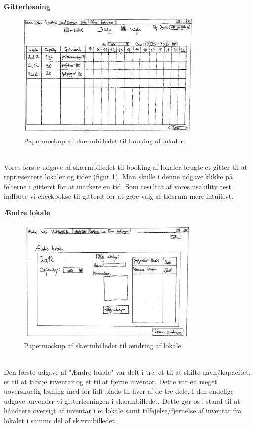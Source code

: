 \textbf{Gitterløsning}
\begin{figure}[h!]
  \centering
    \includegraphics[width=0.8\textwidth]{Appendix/GUI-Prototype/PaperMockup/LokaleListe_001}
  \caption{Papermockup af skærmbilledet til booking af lokaler.}
\label{Design_G_Development_LokaleListe_pm}
\end{figure} 
\\Vores første udgave af skærmbilledet til booking af lokaler brugte et gitter til at repræsentere lokaler og tider (figur \ref{Design_G_Development_LokaleListe_pm}). Man skulle i denne udgave klikke på felterne i gitteret for at markere en tid. Som resultat af vores usability test indførte vi checkbokse til gitteret for at gøre valg af tidsrum mere intuitivt.

\textbf{Ændre lokale}
\begin{figure}[h!]
  \centering
    \includegraphics[width=0.8\textwidth]{Appendix/GUI-Prototype/PaperMockup/AendreLokale_001}
  \caption{Papermockup af skærmbilledet til ændring af lokale.}
\label{Design_G_Development_AendreLokale_Final}
\end{figure} 
\\Den første udgave af "Ændre lokale" var delt i tre: et til at skifte navn/kapacitet, et til at tilføje inventar og et til at fjerne inventar. Dette var en meget uoverskuelig løsning med for lidt plads til hver af de tre dele. I den endelige udgave anvender vi gitterløsningen i skærmbilledet. Dette gør os i stand til at håndtere oversigt af inventar i et lokale samt tilføjelse/fjernelse af inventar fra lokalet i samme del af skærmbilledet.

